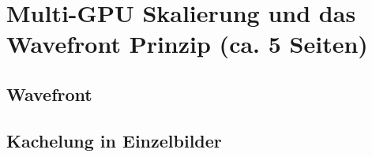 \section{Multi-GPU Skalierung und das Wavefront Prinzip (ca. 5 Seiten)}
\subsection{Wavefront}
\subsection{Kachelung in Einzelbilder}